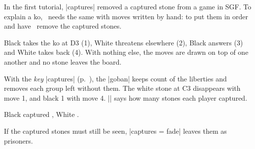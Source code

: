 \begin{goban}
In the first tutorial, |captures| removed a captured stone from a game in SGF. To explain a ko, \karu\ needs the same with moves written by hand: to put them in order and have \pgfgoname\ remove the captured stones.

\begin{figure}[H]
	\centering
	\begin{goban}
	\end{goban}

	\pgfgomovenotes
\end{figure}

Black takes the ko at D3 (1), White threatens elsewhere (2), Black answers (3) and White takes back (4). With nothing else, the moves are drawn on top of one another and no stone leaves the board.

\begin{codeexample}[width=4.8cm]
	\begin{goban}[7]
	\end{goban}
\end{codeexample}

With the \emph{key} |captures| (p.~\pageref{subsec:capturas}), the |goban| keeps count of the liberties and removes each group left without them. The white stone at C3 disappears with move 1, and black 1 with move 4. |\pgfgoprisoners| says how many stones each player captured.

\begin{codeexample}[width=4.8cm]
	\begin{goban}[7, captures]
	\end{goban}

	Black captured ,
	White .
\end{codeexample}

If the captured stones must still be seen, |captures = fade| leaves them as prisoners.

\begin{codeexample}[width=4.8cm]
	\begin{goban}[7, captures = fade]
	\end{goban}
\end{codeexample}


\end{goban}
